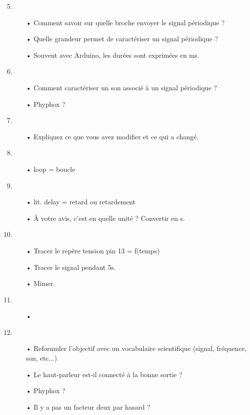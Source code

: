 \documentclass[12pt,a4paper]{article}
\begin{document}
\begin{enumerate}
\setcounter{enumi}{4}

\item
\begin{itemize}
\item[•] Comment savoir sur quelle broche envoyer le signal périodique ?
\item[•] Quelle grandeur permet de caractériser un signal périodique ?
\item[•] Souvent avec Arduino, les durées sont exprimées en ms.
\end{itemize}

\item
\begin{itemize}
\item[•] Comment caractériser un son associé à un signal périodique ?
\item[•] Phyphox ?
\end{itemize}

\item
\begin{itemize}
\item[•] Expliquez ce que vous avez modifier et ce qui a changé.
\end{itemize}

\item
\begin{itemize}
\item[•] loop = boucle
\end{itemize}

\item
\begin{itemize}
\item[•] lit. delay = retard ou retardement
\item[•] À votre avis, c'est en quelle unité ?
Convertir en s.
\end{itemize}

\item
\begin{itemize}
\item[•] Tracer le repère tension pin 13 = f(temps)
\item[•] Tracer le signal pendant 5s.
\item[•] Mimer.
\end{itemize}

\item
\begin{itemize}
\item[•]
\end{itemize}

\item
\begin{itemize}
\item[•] Reformuler l'objectif avec un vocabulaire scientifique (signal, fréquence, son, etc...)
\item[•] Le haut-parleur est-il connecté à la bonne sortie ?
\item[•] Phyphox ?
\item[•] Il y a pas un facteur deux par hasard ?
\end{itemize}
\end{enumerate}
\end{document}
